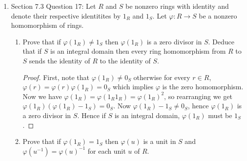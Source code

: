 \documentclass{article}
\begin{document}
\begin{enumerate}[label={\bf Q\arabic*:}]
\begin{enumerate}
\begin{proof}
\begin{align*}
                        &= \sum_{i=1}^na_i|p(x)| \\
                        &= \sum_{i=1}^na_i\cdot0 \\
                        &= 0, \\
          \end{align*}
          so $S$ is closed under left multplication by elements
          in $\mathbb{Z}[x]$.
        \end{proof}
      \item The set of polynomials $p(x)$ such that $p'(0)=0$, where
        $p'(x)$ is the usual first derivative of $p(x)$ with respect to
        $x$.
        \begin{proof}
          No. Note that $p'(0)=0$ if and only if the coefficient of $x$ is
          0. Hence this set is not closed under left multiplication by
          elements in $\mathbb{Z}[x]$, since $x\cdot(x^2+1)=x^3+x$ is not
          contained in the set even though $x^2+1$ is.
        \end{proof}
    \end{enumerate}

  \item Section 7.3 Question 17: Let $R$ and $S$ be nonzero rings with
    identity and denote their respective identitites by $1_R$ and $1_S$.
    Let $\varphi:R\rightarrow S$ be a nonzero homomorphism of rings.
    \begin{enumerate}
      \item Prove that if $\varphi(1_R)\neq1_S$ then $\varphi(1_R)$ is a
        zero divisor in $S$. Deduce that if $S$ is an integral domain then
        every ring homomorphism from $R$ to $S$ sends the identity of $R$
        to the identity of $S$.

        \begin{proof}
          First, note that $\varphi(1_R)\neq0_S$ otherwise for every $r\in
          R$, $\varphi(r)=\varphi(r)\varphi(1_R)=0_S$ which implies
          $\varphi$ is the zero homomorphism. Now we have
          $\varphi(1_R)=\varphi(1_R1_R)=\varphi(1_R)^2$, so rearranging we
          get $\varphi(1_R)(\varphi(1_R)-1_S)=0_S$. Now
          $\varphi(1_R)-1_S\neq0_S$, hence $\varphi(1_R)$ is a zero divisor
          in $S$. Hence if $S$ is an integral domain, $\varphi(1_R)$ must
          be $1_S$.
        \end{proof}

      \item Prove that if $\varphi(1_R)=1_S$ then $\varphi(u)$ is a unit in
        $S$ and $\varphi(u^{-1})=\varphi(u)^{-1}$ for each unit $u$ of $R$.


\end{enumerate}
\end{enumerate}
\end{document}
